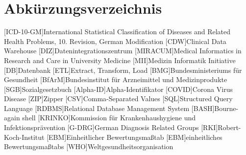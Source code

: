\section*{Abkürzungsverzeichnis}
\setcounter{page}{3}
\begin{acronym}[acrmeta]		
	[ICD-10-GM]{International Statistical Classification of Diseases and Related Health Problems, 10. Revision, German Modification}
	[CDW]{Clinical Data Warehouse}
	[DIZ]{Datenintegrationszentrum}
	[MIRACUM]{Medical Informatics in Research and Care in University Medicine}
	[MII]{Medizin Informatik Initiative}
	[DB]{Datenbank}
	[ETL]{Extract, Transform, Load}
	[BMG]{Bundesministeriums für Gesundheit}
	[BfArM]{Bundesinstitut für Arzneimittel und Medizinprodukte}
	[SGB]{Sozialgesetzbuch}
	[Alpha-ID]{Alpha-Identifikator}
	[COVID]{Corona Virus Disease}
	[ZIP]{Zipper}
	[CSV]{Comma-Separated Values}
	[SQL]{Structured Query Language}
	[RDBMS]{Relational Database Management System}
	[BASH]{Bourne-again shell}
	[KRINKO]{Kommission für Krankenhaushygiene und Infektionsprävention}
	[G-DRG]{German Diagnosis Related Groups}
	[RKI]{Robert-Koch-Institut}
	[EBM]{Einheitlicher Bewertungsmaßtab}
	[EBM]{einheitliches Bewertungsmaßtabs}
	[WHO]{Weltgesundheitsorganisation}
\end{acronym}